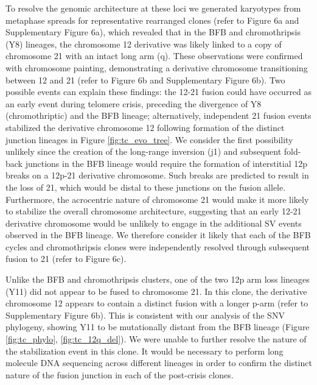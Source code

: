 \documentclass[phd,tocprelim]{cornell}
\begin{document}
To resolve the genomic architecture at these loci we generated karyotypes from metaphase spreads for representative rearranged clones (refer to \cite{Dewhurst2021-jk} Figure 6a and Supplementary Figure 6a), which revealed that in the BFB and chromothripsis (Y8) lineages, the chromosome 12 derivative was likely linked to a copy of chromosome 21 with an intact long arm (q). These observations were confirmed with chromosome painting, demonstrating a derivative chromosome transitioning between 12 and 21 (refer to \cite{Dewhurst2021-jk} Figure 6b and Supplementary Figure 6b). Two possible events can explain these findings: the 12-21 fusion could have occurred as an early event during telomere crisis, preceding the divergence of Y8 (chromothriptic) and the BFB lineage; alternatively, independent 21 fusion events stabilized the derivative chromosome 12 following formation of the distinct junction lineages in Figure \ref{fig:tc_evo_tree}. We consider the first possibility unlikely since the creation of the long-range inversion (j1) and subsequent fold-back junctions in the BFB lineage would require the formation of interstitial 12p breaks on a 12p-21 derivative chromosome. Such breaks are predicted to result in the loss of 21, which would be distal to these junctions on the fusion allele. Furthermore, the acrocentric nature of chromosome 21 would make it more likely to stabilize the overall chromosome architecture, suggesting that an early 12-21 derivative chromosome would be unlikely to engage in the additional SV events observed in the BFB lineage. We therefore consider it likely that each of the BFB cycles and chromothripsis clones were independently resolved through subsequent fusion to 21 (refer to \cite{Dewhurst2021-jk} Figure 6c).

Unlike the BFB and chromothripsis clusters, one of the two 12p arm loss lineages (Y11) did not appear to be fused to chromosome 21. In this clone, the derivative chromosome 12 appears to contain a distinct fusion with a longer p-arm (refer to \cite{Dewhurst2021-jk}Supplementary Figure 6b). This is consistent with our analysis of the SNV phylogeny, showing Y11 to be mutationally distant from the BFB lineage (Figure \ref{fig:tc_phylo}, \ref{fig:tc_12q_del}).  We were unable to further resolve the nature of the stabilization event in this clone. It would be necessary to perform long molecule DNA sequencing across different lineages in order to confirm the distinct nature of the fusion junction in each of the post-crisis clones.
\end{document}
